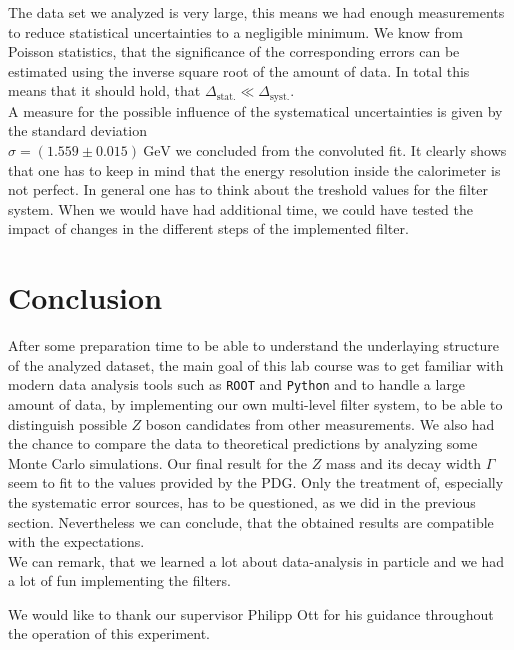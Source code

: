 \documentclass[twocolumn,
			   showpacs,%
               nofootinbib,
               aps,%
               prd,
               notitlepage,
               showkeys,
               10pt]{revtex4-1}
\begin{document}
The data set we analyzed is very large, this means we had enough measurements to reduce statistical uncertainties to a negligible minimum. We know from Poisson statistics, that the significance of the corresponding errors can be estimated using the inverse square root of the amount of data. In total this means that it should hold, that $\Delta_{\mathrm{stat.}} \ll \Delta_{\mathrm{syst.}}$. \\
A measure for the possible influence of the systematical uncertainties is given by the standard deviation \\ $\sigma = (1.559 \pm 0.015) \ \text{GeV}$ we concluded from the convoluted fit. It clearly shows that one has to keep in mind that the energy resolution inside the calorimeter is not perfect. In general one has to think about the treshold values for the filter system. When we would have had additional time, we could have tested the impact of changes in the different steps of the implemented filter.

\section{Conclusion}
After some preparation time to be able to understand the underlaying structure of the analyzed dataset, the main goal of this lab course was to get familiar with modern data analysis tools such as \verb|ROOT| and \verb|Python| and to handle a large amount of data, by implementing our own multi-level filter system, to be able to distinguish possible $Z$ boson candidates from other measurements. We also had the chance to compare the data to theoretical predictions by analyzing some Monte Carlo simulations. Our final result for the $Z$ mass and its decay width $\Gamma$ seem to fit to the values provided by the PDG. Only the treatment of, especially the systematic error sources,  has to  be questioned, as we did in the previous section. Nevertheless we can conclude, that the obtained results are compatible with the expectations.\\
We can remark, that we learned a lot about data-analysis in particle and we had a lot of fun implementing the filters.  
\begin{acknowledgments}
We would like to thank our supervisor Philipp Ott for his guidance throughout the operation of this experiment.
\end{acknowledgments}



\nocite{*}
\end{document}
